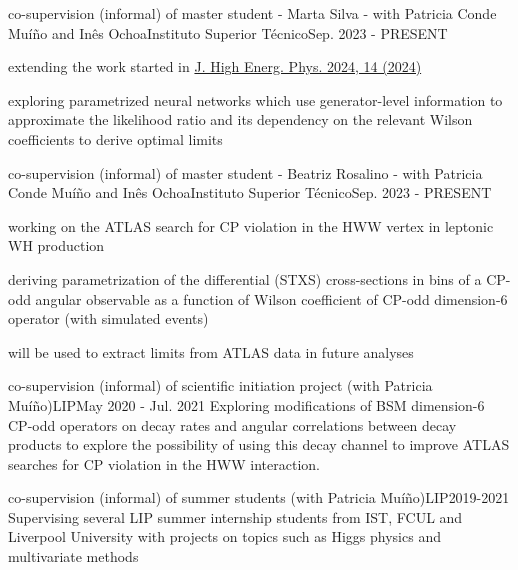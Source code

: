 
\begin{cventries}
    {co-supervision (informal) of master student - Marta Silva - with Patricia Conde Muíño and Inês Ochoa}{Instituto Superior Técnico}{Sep. 2023 - PRESENT}
    {
        \begin{cvitems}
            \item {extending the work started in \href{https://doi.org/10.1007/JHEP04(2024)014}{J. High Energ. Phys. 2024, 14 (2024)}}
            \item {exploring parametrized neural networks which use generator-level information to approximate the likelihood ratio and its dependency on the relevant Wilson coefficients to derive optimal limits}
        \end{cvitems}
    }\vspace*{2mm}

    {co-supervision (informal) of master student - Beatriz Rosalino - with Patricia Conde Muíño and Inês Ochoa}{Instituto Superior Técnico}{Sep. 2023 - PRESENT}
    {
        \begin{cvitems}
            \item {working on the ATLAS search for CP violation in the HWW vertex in leptonic WH production}
            \item {deriving parametrization of the differential (STXS) cross-sections in bins of a CP-odd angular observable as a function of Wilson coefficient of CP-odd dimension-6 operator (with simulated events)}
            \item {will be used to extract limits from ATLAS data in future analyses}
        \end{cvitems}
    }
    
    {co-supervision (informal) of scientific initiation project (with Patricia Muíño)}{LIP}{May 2020 - Jul. 2021}
    {
        Exploring modifications of BSM dimension-6 CP-odd operators on decay rates and angular correlations between decay products to explore the possibility of using this decay channel to improve ATLAS searches for CP violation in the HWW interaction.
    }

    {co-supervision (informal) of summer students (with Patricia Muíño)}{LIP}{2019-2021}
    {Supervising several LIP summer internship students from IST, FCUL and Liverpool University with projects on topics such as Higgs physics and multivariate methods}

\end{cventries}